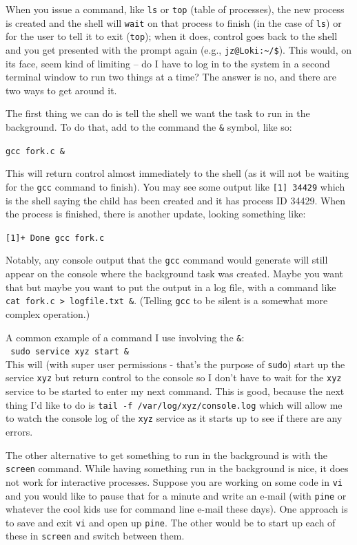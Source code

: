 When you issue a command, like \texttt{ls} or \texttt{top} (table of processes), the new process is created and the shell will \texttt{wait} on that process to finish (in the case of \texttt{ls}) or for the user to tell it to exit (\texttt{top}); when it does, control goes back to the shell and you get presented with the prompt again (e.g., \texttt{jz@Loki:\~{}/\$}). This would, on its face, seem kind of limiting -- do I have to log in to the system in a second terminal window to run two things at a time? The answer is no, and there are two ways to get around it.

The first thing we can do is tell the shell we want the task to run in the background. To do that, add to the command the \texttt{\&} symbol, like so:

\texttt{gcc fork.c \&}

This will return control almost immediately to the shell (as it will not be waiting for the \texttt{gcc} command to finish). You may see some output like \texttt{[1] 34429} which is the shell saying the child has been created and it has process ID 34429. When the process is finished, there is another update, looking something like:

\texttt{[1]+  Done                    gcc fork.c}

Notably, any console output that the \texttt{gcc} command would generate will still appear on the console where the background task was created. Maybe you want that but maybe you want to put the output in a log file, with a command like \texttt{cat fork.c > logfile.txt \&}. (Telling \texttt{gcc} to be silent is a somewhat more complex operation.)

A common example of a command I use involving the \texttt{\&}:\\
\texttt{ sudo service xyz start \& }\\
This will (with super user permissions - that's the purpose of \texttt{sudo}) start up the service \texttt{xyz} but return control to the console so I don't have to wait for the \texttt{xyz} service to be started to enter my next command. This is good, because the next thing I'd like to do is \texttt{tail -f /var/log/xyz/console.log} which will allow me to watch the console log of the \texttt{xyz} service as it starts up to see if there are any errors.

The other alternative to get something to run in the background is with the \texttt{screen} command. While having something run in the background is nice, it does not work for interactive processes. Suppose you are working on some code in \texttt{vi} and you would like to pause that for a minute and write an e-mail (with \texttt{pine} or whatever the cool kids use for command line e-mail these days). One approach is to save and exit \texttt{vi} and open up \texttt{pine}. The other would be to start up each of these in \texttt{screen} and switch between them.

